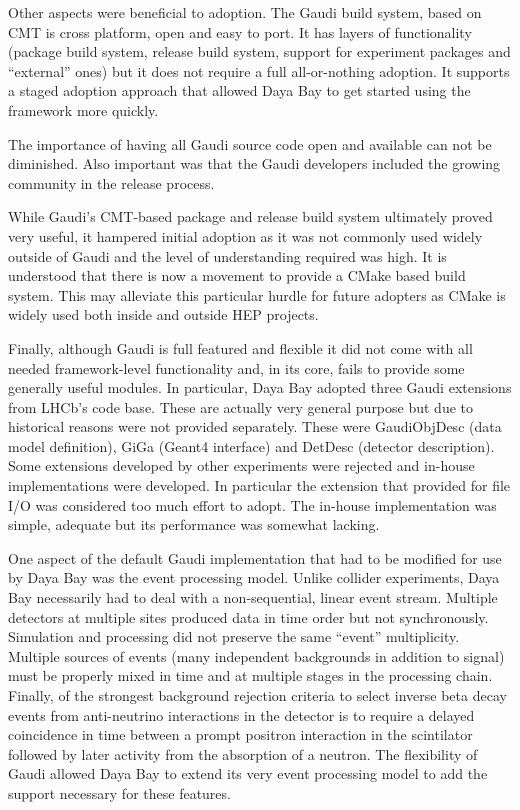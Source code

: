Other aspects were beneficial to adoption.  The Gaudi build system,
based on CMT\cite{cmt} is cross platform, open and easy to port.  It has layers
of functionality (package build system, release build system, support
for experiment packages and ``external'' ones) but it does not require a full
all-or-nothing adoption.  It supports a staged adoption approach that
allowed Daya Bay to get started using the framework more quickly.

The importance of having all Gaudi source code open and available can
not be diminished.  Also important was that the Gaudi developers included
the growing community in the release process.

While Gaudi's CMT-based package and release build system ultimately
proved very useful, it hampered initial adoption as it was not commonly
used widely outside  of Gaudi and the level of understanding required was high.  
It is understood that there is now a
movement to provide a CMake based build system.  This may alleviate
this particular hurdle for future adopters as CMake is widely used both inside and outside HEP projects.

Finally, although Gaudi is full featured and flexible it did not come
with all needed framework-level functionality and, in its core, fails
to provide some generally useful modules.  In particular, Daya Bay
adopted three Gaudi extensions from LHCb's code base.  These are
actually very general purpose but due to historical reasons were not
provided separately.  These were GaudiObjDesc (data model definition),
GiGa (Geant4 interface) and DetDesc (detector description).  Some
extensions developed by other experiments were rejected and in-house
implementations were developed.  In particular the extension that
provided for file I/O was considered too much effort to adopt.  The
in-house implementation was simple, adequate but its performance was
somewhat lacking.  

One aspect of the default Gaudi implementation that had to be modified for use by Daya
Bay was the event processing model.  Unlike collider
experiments, Daya Bay necessarily had to deal with a non-sequential,
linear event stream.  Multiple detectors at multiple sites produced
data in time order but not synchronously.  Simulation and processing
did not preserve the same ``event'' multiplicity.  Multiple sources of
events (many independent backgrounds in addition to signal) must be
properly mixed in time and at multiple stages in the processing chain.  
Finally, of the strongest background rejection
criteria to select inverse beta decay events 
from anti-neutrino interactions in the detector
is to require a delayed coincidence in time between a prompt positron
interaction in the scintilator followed by later activity from the
absorption of a neutron.  The flexibility of Gaudi allowed Daya Bay to
extend its very event processing model to add the support necessary
for these features.

